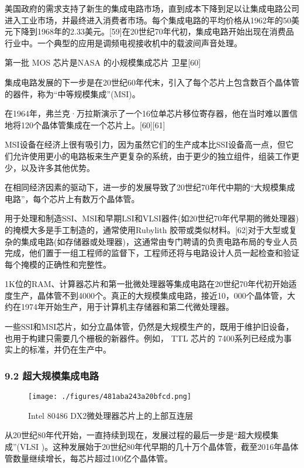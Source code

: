 美国政府的需求支持了新生的集成电路市场，直到成本下降到足以让集成电路公司进入工业市场，并最终进入消费者市场。每个集成电路的平均价格从1962年的50美元下降到1968年的2.33美元。[59]在20世纪70年代初，集成电路开始出现在消费品行业中。一个典型的应用是调频电视接收机中的载波间声音处理。

第一批 MOS 芯片是NASA 的小规模集成芯片 卫星[60]

集成电路发展的下一步是在20世纪60年代末，引入了每个芯片上包含数百个晶体管的器件，称为“中等规模集成”(MSI)。

在1964年，弗兰克·万拉斯演示了一个16位单芯片移位寄存器，他在当时难以置信地将120个晶体管集成在一个芯片上。[60][61]

MSI设备在经济上很有吸引力，因为虽然它们的生产成本比SSI设备高一点，但它们允许使用更小的电路板来生产更复杂的系统，由于更少的独立组件，组装工作更少，以及许多其他优势。

在相同经济因素的驱动下，进一步的发展导致了20世纪70年代中期的“大规模集成电路”，每个芯片上有数万个晶体管。

用于处理和制造SSI、MSI和早期LSI和VLSI器件(如20世纪70年代早期的微处理器)的掩模大多是手工制造的，通常使用Rubylith 胶带或类似材料。[62]对于大型或复杂的集成电路(如存储器或处理器)，这通常由专门聘请的负责电路布局的专业人员完成，他们置于一组工程师的监督下，工程师还将与电路设计人员一起检查和验证每个掩模的正确性和完整性。

1K位的RAM、计算器芯片和第一批微处理器等集成电路在20世纪70年代初开始适度生产，晶体管不到4000个。真正的大规模集成电路，接近10，000个晶体管，大约在1974年开始生产，用于计算机主存储器和第二代微处理器。

一些SSI和MSI芯片，如分立晶体管，仍然是大规模生产的，既用于维护旧设备，也用于构建只需要几个栅极的新器件。例如， TTL 芯片的 7400系列已经成为事实上的标准，并仍在生产中。

\subsubsection{9.2 超大规模集成电路}

\begin{figure}[ht]
\centering
\texttt{[image: ./figures/481aba243a20bfcd.png]}
\caption{Intel 80486 DX2微处理器芯片上的上部互连层} \label{fig_icJCDL_8}
\end{figure}

从20世纪80年代开始，一直持续到现在，发展过程的最后一步是“超大规模集成”(VLSI )。这种发展始于20世纪80年代早期的几十万个晶体管，截至2016年晶体管数量继续增长，每芯片超过100亿个晶体管。

